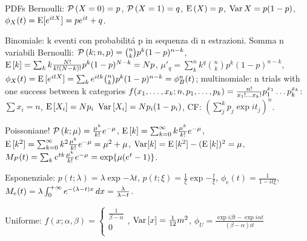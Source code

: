 \documentclass[asd-beamer.tex]{subfiles}
\begin{document}
\begin{frame}[allowframebreaks]{PDFs}
Bernoulli: $\operatorname{\mathcal{P}}{(X=0)}=p$, $\operatorname{\mathcal{P}}{(X=1)}=q$, $\operatorname{E}{(X)}=p$, $\operatorname{Var}{X}=p(1-p)$, $\phi_X(t)=\operatorname{E}[e^{itX}]=pe^{it}+q$.

Binomiale: k eventi con probabilit\'a p in sequenza di n estrazioni. Somma n variabili Bernoulli: $\operatorname{\mathcal{P}}{(k;n,p)}=\binom{n}{k}p^k(1-p)^{n-k}$, $\operatorname{E}{[k]}=\sum_kk\frac{N!}{k!(N-k)!}p^k(1-p)^{N-k}=Np$, $\mu'_q=\sum_k^nk^q\binom{n}{k}p^k(1-p)^{n-k}$, $\phi_X(t)=\operatorname{E}{[e^{itX}]}=\sum_ke^{itk}\binom{n}{k}p^k(1-p)^{n-k}=\phi_B^n(t)$; multinomiale: n trials with one success between k categories $f(x_1,\ldots,x_k;n,p_1,\ldots,p_k)=\frac{n!}{x_1!\ldots x_k!}p_1^{x_1}\ldots p_k^{x_k}$: $\sum x_i=n$, $\E{[X_i]}=Np_i\ \var{[X_i]}=Np_i(1-p_i)$, CF: $(\sum_j^kp_j\exp{it_j})^n$.

Poissoniane! $\operatorname{\mathcal{P}}{(k;\mu)}=\frac{\mu^k}{k!}e^{-\mu}$, $\operatorname{E}{[k]}=\sum_{k=0}^{\infty}k\frac{\mu^k}{k!}e^{-\mu}$, $\operatorname{E}{[k^2]}=\sum_{k=0}^{\infty}k^2\frac{\mu^k}{k!}e^{-\mu}=\mu^2+\mu$, $\operatorname{Var}[k]=\operatorname{E}{[k^2]}-(\operatorname{E}{[k]})^2=\mu$, $M_P(t)=\sum_ke^{tk}\frac{\mu^k}{k!}e^{-\mu}=\text{exp}\{\mu(e^{t}-1)\}$.

Esponenziale: $p(t;\lambda)=\lambda\exp{-\lambda t}$, $p(t;\xi)=\frac{1}{\xi}\exp{-\frac{t}{\xi}}$, $\phi_e(t)=\frac{1}{1-it\xi}$, $M_e(t)=\lambda\int_{0}^{+\infty}{}e^{-(\lambda-t)x}\,dx=\frac{\lambda}{\lambda-t}$.

Uniforme: $f(x;\alpha,\beta)=\left\{\begin{array}{c}\frac{1}{\beta-\alpha}\\0\\
			\end{array}\right.$, $\operatorname{Var}{[x]}=\frac{1}{12}m^2$, $\phi_U=\frac{\exp{i\beta t}-\exp{i\alpha t}}{(\beta-\alpha)it}$
\end{frame}
\end{document}
